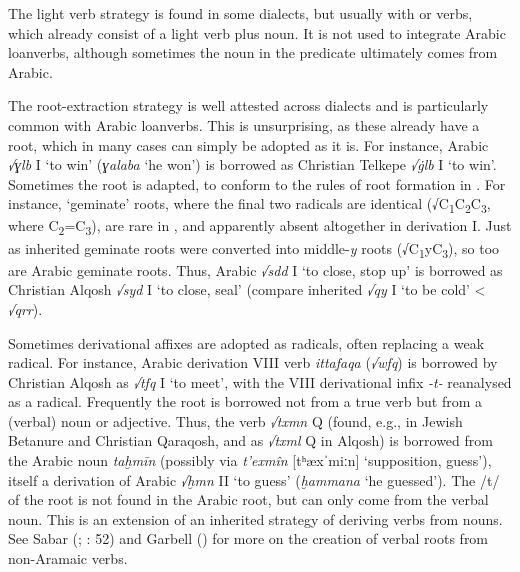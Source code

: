 \documentclass[output=paper]{langsci/langscibook}
\begin{document}
The {light verb} strategy is found in some  dialects, but usually with  or  verbs, which already consist of a {light verb} plus noun. It is not used to integrate Arabic loanverbs, although sometimes the noun in the predicate ultimately comes from Arabic.

The root-extraction strategy is well attested across  dialects and is particularly common with Arabic loanverbs. This is unsurprising, as these already have a {root}, which in many cases can simply be adopted as it is. For instance, Arabic \textit{√ɣlb} I ‘to win’ (\textit{ɣalaba} ‘he won’) is borrowed as Christian Telkepe \textit{√\.glb} I ‘to win’. Sometimes the {root} is adapted, to conform to the rules of {root} {formation} in . For instance, ‘geminate’ {roots}, where the final two radicals are identical (√C\textsubscript{1}C\textsubscript{2}C\textsubscript{3}, where C\textsubscript{2}=C\textsubscript{3}), are rare in , and apparently absent altogether in {derivation} I. Just as inherited geminate {roots} were converted into middle-\textit{y} {roots} (√C\textsubscript{1}yC\textsubscript{3}), so too are Arabic geminate {roots}. Thus, Arabic \textit{√sdd} I ‘to close, stop up’ is borrowed as Christian Alqosh \textit{√syd} I ‘to close, seal’ (compare inherited \textit{√qy{\R}} I ‘to be cold’ < \textit{√qrr}).

Sometimes {derivational} affixes are adopted as radicals, often replacing a weak radical. For instance, Arabic {derivation} VIII verb \textit{ittafaqa} (\textit{√wfq}) is borrowed by Christian Alqosh as \textit{√tfq} I ‘to meet’, with the VIII {derivational} infix \textit{\nobreakdash-t\nobreakdash-} reanalysed as a radical. Frequently the {root} is borrowed not from a true verb but from a (verbal) noun or adjective. Thus, the  verb \textit{√txmn} Q (found, e.g., in Jewish Betanure and Christian Qaraqosh, and as \textit{√txml} Q in Alqosh) is borrowed from the Arabic noun \textit{taḫmīn} (possibly via  \textit{t’exmîn} [tʰæxˈmiːn] ‘supposition, guess’), itself a {derivation} of Arabic \textit{√ḫmn} II ‘to guess’ (\textit{ḫammana} ‘he guessed’). The /t/ of the  {root} is not found in the Arabic {root}, but can only come from the verbal noun. This is an {extension} of an inherited  strategy of deriving verbs from nouns. See Sabar (\citeyear{Sabar1984}; \citeyear{Sabar2002}: 52) and Garbell (\citeyear[166]{Garbell1965}) for more on the creation of verbal {roots} from non-Aramaic verbs.\largerpage
\end{document}
